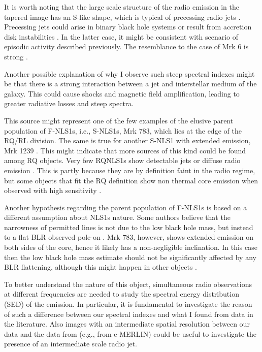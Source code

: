 \documentclass[../main.tex]{subfiles}
\begin{document}
It is worth noting that the large scale structure of the radio emission in the tapered image has an S-like shape, which is typical of precessing radio jets \citep{Ekers78,Parma85}.
Precessing jets could arise in binary black hole systems \citep[e.g.,][]{Roos93,Romero00,Rubinur17} or result from accretion disk instabilities \citep{Pringle96,Livio97}.
In the latter case, it might be consistent with scenario of episodic activity described previously. 
The resemblance to the case of Mrk 6 is strong \citep{Kharb06}.  

Another possible explanation of why I observe such steep spectral indexes might be that there is a strong interaction between a jet and interstellar medium of the galaxy.
This could cause shocks and magnetic field amplification, leading to greater radiative losses and steep spectra.

This source might represent one of the few examples of the elusive parent population of F-NLS1s, i.e., S-NLS1s, 
Mrk 783, which lies at the edge of the RQ/RL division.
The same is true for another S-NLS1 with extended emission, Mrk 1239 \citep{Doi15}.
This might indicate that more sources of this kind could be found among RQ objects. 
Very few RQNLS1s show detectable jets or diffuse radio emission \citep{Berton16b}.
This is partly because they are by definition faint in the radio regime, but some objects that fit the RQ definition show non thermal core emission when observed with high sensitivity \citep{Giroletti09}.

Another hypothesis regarding the parent population of F-NLS1s is based on a different assumption about NLS1s nature. 
Some authors believe that the narrowness of permitted lines is not due to the low black hole mass, but instead to a flat BLR observed pole-on \citep[e.g.,][]{Decarli08}. 
Mrk 783, however, shows extended emission on both sides of the core, hence it likely has a non-negligible inclination. 
In this case then the low black hole mass estimate should not be significantly affected by any BLR flattening, although this might happen in other objects \citep{Shen14}. 

To better understand the nature of this object, simultaneous radio observations at different frequencies are needed to study the spectral energy distribution (SED) of the emission.
In particular, it is fundamental to investigate the reason of such a difference between our spectral indexes and what I found from data in the literature.
Also images with an intermediate spatial resolution between our data and the data from \citet{Doi13} (e.g., from e-MERLIN) could be useful to investigate the presence of an intermediate scale radio jet.
\end{document}

